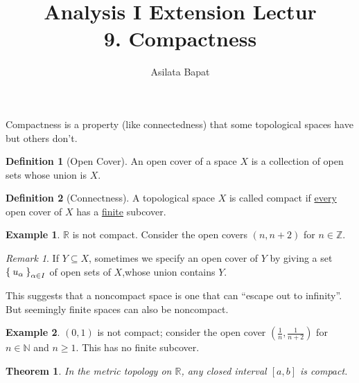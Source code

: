 \documentclass[12pt]{amsart}
\title[Compactness]
	{Analysis I Extension Lectur\\9. Compactness}
\author{Asilata Bapat}
\newcommand{\bbR}{\mathbb{R}}
\newcommand{\bbN}{\mathbb{N}}
\newcommand{\bbZ}{\mathbb{Z}}
\theoremstyle{plain}
\newtheorem*{thm}{Theorem}
\theoremstyle{remark}
\newtheorem*{rmk}{Remark}
\theoremstyle{definition}
\newtheorem*{define}{Definition}
\newtheorem*{eg}{Example}
\begin{document}
\maketitle

Compactness is a property (like connectedness) that some topological spaces have but others don't.
\begin{define}[Open Cover]
An open cover of a space $X$ is a collection of open sets whose union is $X$.
\end{define}

\begin{define}[Connectness]
A topological space $X$ is called compact if \underline{every} open cover of $X$ has a \underline{finite} subcover.
\end{define}

\begin{eg}
$\bbR$ is not compact. Consider the open covers $(n, n+2)$ for $n \in \bbZ$.
\end{eg}
\begin{rmk}
If $Y \subseteq X$, sometimes we specify an open cover of $Y$ by giving a set $\Set{u_{\alpha}}_{\alpha \in I}$ of open sets of $X$,whose union contains $Y$.
\end{rmk}

This suggests that a noncompact space is one that can ``escape out to infinity''. But seemingly finite spaces can also be noncompact. 

\begin{eg}
$(0,1)$ is not compact; consider the open cover $(\frac{1}{n}, \frac{1}{n+2})$ for $n \in \bbN$ and $n \geqslant 1$. This has no finite subcover.
\end{eg}

\begin{thm}
In the metric topology on $\bbR$, any closed interval $[a, b]$ is compact.
\end{thm}
\end{document}
